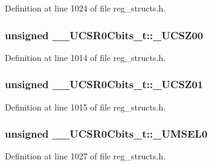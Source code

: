 Definition at line 1024 of file reg\+\_\+structs.\+h.

\hypertarget{union_____u_c_s_r0_cbits__t_a433e313ebba9b8b61bc6f5b8f9cef3b9}{
\subsubsection[{\+\_\+\+U\+C\+S\+Z00}]{\setlength{\rightskip}{0pt plus 5cm}unsigned \+\_\+\+\_\+\+U\+C\+S\+R0\+Cbits\+\_\+t\+::\+\_\+\+U\+C\+S\+Z00}}\label{union_____u_c_s_r0_cbits__t_a433e313ebba9b8b61bc6f5b8f9cef3b9}


Definition at line 1014 of file reg\+\_\+structs.\+h.

\hypertarget{union_____u_c_s_r0_cbits__t_a0054be72298ce9e514beccdc511cc3ef}{
\subsubsection[{\+\_\+\+U\+C\+S\+Z01}]{\setlength{\rightskip}{0pt plus 5cm}unsigned \+\_\+\+\_\+\+U\+C\+S\+R0\+Cbits\+\_\+t\+::\+\_\+\+U\+C\+S\+Z01}}\label{union_____u_c_s_r0_cbits__t_a0054be72298ce9e514beccdc511cc3ef}


Definition at line 1015 of file reg\+\_\+structs.\+h.

\hypertarget{union_____u_c_s_r0_cbits__t_a16db88c115cd0a56f7b72900987f8bac}{
\subsubsection[{\+\_\+\+U\+M\+S\+E\+L0}]{\setlength{\rightskip}{0pt plus 5cm}unsigned \+\_\+\+\_\+\+U\+C\+S\+R0\+Cbits\+\_\+t\+::\+\_\+\+U\+M\+S\+E\+L0}}\label{union_____u_c_s_r0_cbits__t_a16db88c115cd0a56f7b72900987f8bac}


Definition at line 1027 of file reg\+\_\+structs.\+h.


